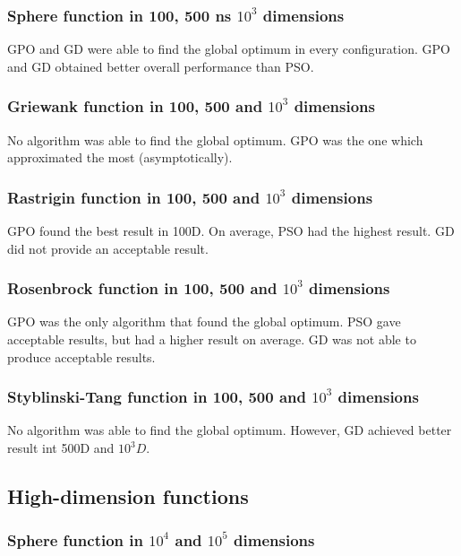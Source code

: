 \documentclass[10pt]{article}
\begin{document}
\subsubsection{Sphere function in 100, 500 ns $10^3$ dimensions}

GPO and GD were able to find the global optimum in every configuration. GPO and
GD obtained better overall performance than PSO.

\subsubsection{Griewank function in 100, 500 and $10^3$ dimensions}

No algorithm was able to find the global optimum. GPO was the one which
approximated the most (asymptotically).

\subsubsection{Rastrigin function in 100, 500 and $10^3$ dimensions}

GPO found the best result in 100D. On average, PSO had the highest result. GD
did not provide an acceptable result.

\subsubsection{Rosenbrock function in 100, 500 and $10^3$ dimensions}

GPO was the only algorithm that found the global optimum. PSO gave acceptable
results, but had a higher result on average. GD was not able to produce
acceptable results.

\subsubsection{Styblinski-Tang function in 100, 500 and $10^3$ dimensions}

No algorithm was able to find the global optimum. However, GD achieved better
result int 500D and $10^3D$.

\subsection{High-dimension functions}

\subsubsection{Sphere function in $10^4$ and $10^5$ dimensions}
\end{document}
